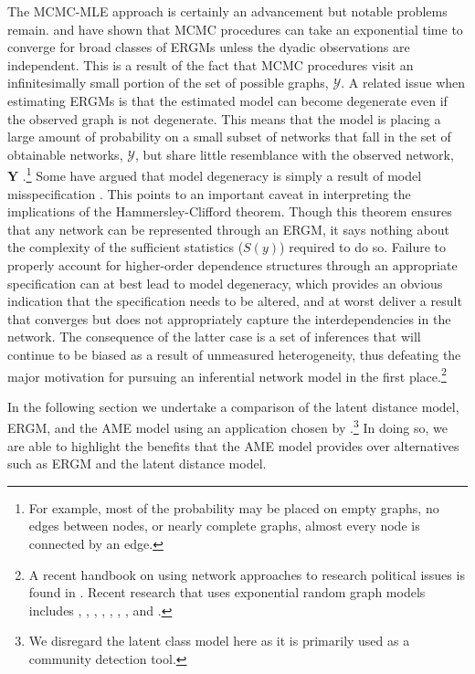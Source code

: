 \documentclass[12pt,onesided,pdflatex]{amsart}
\begin{document}
The MCMC-MLE approach is certainly an advancement but notable problems remain. \citet{bhamidi:etal:2008} and \citet{chatterjee:diaconis:2013} have shown that MCMC procedures can take an exponential time to converge for broad classes of ERGMs unless the dyadic observations are independent. This is a result of the fact that MCMC procedures visit an infinitesimally small portion of the set of possible graphs, $\mathcal{Y}$. A related issue when estimating ERGMs is that the estimated model can become degenerate even if the observed graph is not degenerate. This means that the model is placing a large amount of probability on a small subset of networks that fall in the set of obtainable networks, $\mathcal{Y}$, but share little resemblance with the observed network, $\mathbf{Y}$ \citep{schweinberger:2011}.\footnote{For example, most of the probability may be placed on empty graphs, no edges between nodes, or nearly complete graphs, almost every node is connected by an edge.} Some have argued that model degeneracy is simply a result of model misspecification \citep{handcock:2003b,goodreau:etal:2008,handcock:etal:2008}. This points to an important caveat in interpreting the implications of the Hammersley-Clifford theorem. Though this theorem ensures that any network can be represented through an ERGM, it says nothing about the complexity of the sufficient statistics ($S(y)$) required to do so. Failure to properly account for higher-order dependence structures through an appropriate specification can at best lead to model degeneracy, which provides an obvious indication that the specification needs to be altered, and at worst deliver a result that converges but does not appropriately capture the interdependencies in the network. The consequence of the latter case is a set of inferences that will continue to be biased as a result of unmeasured heterogeneity, thus defeating the major motivation for pursuing an inferential network model in the first place.\footnote{A recent handbook on using network approaches to research political issues is found in \citet{victor:etal:2016}.  Recent research that uses exponential random graph models includes \citet{victor:ringe:2009}, \citet{berardo:scholz:2010}, \citet{calvo:leiras:2012}, \citet{lubell:etal:2012}, \citet{robbins:etal:2012}, \citet{aleman:calvo:2013}, \citet{heaney:2014}, and \citet{kirkland:williams:2014}.}

In the following section we undertake a comparison of the latent distance model, ERGM, and the AME model using an application chosen by \citet{cranmer:etal:2016}.\footnote{We disregard the latent class model here as it is primarily used as a community detection tool.} In doing so, we are able to highlight the benefits that the AME model provides over alternatives such as ERGM and the latent distance model.
\end{document}
